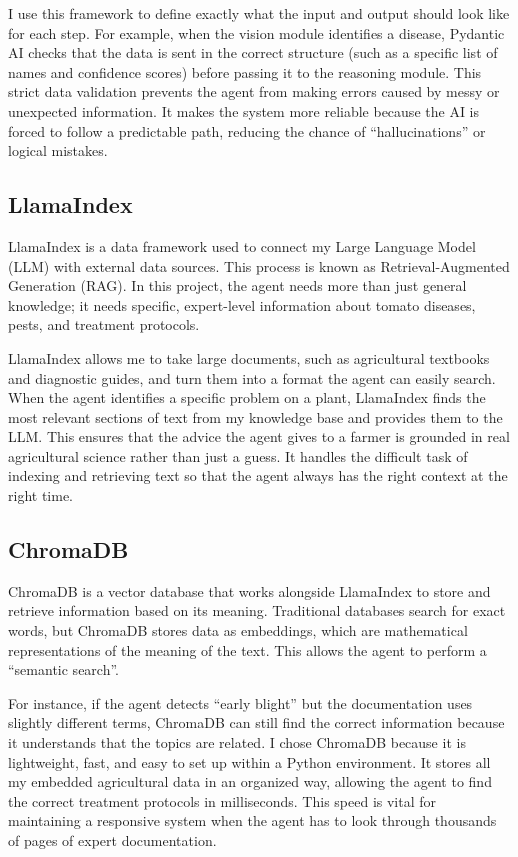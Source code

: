 I use this framework to define exactly what the input and output should look like for each step. For example, when the vision module identifies a disease, Pydantic AI checks that the data is sent in the correct structure (such as a specific list of names and confidence scores) before passing it to the reasoning module. This strict data validation prevents the agent from making errors caused by messy or unexpected information. It makes the system more reliable because the AI is forced to follow a predictable path, reducing the chance of ``hallucinations'' or logical mistakes.

\subsection{LlamaIndex}
LlamaIndex is a data framework used to connect my Large Language Model (LLM) with external data sources. This process is known as Retrieval-Augmented Generation (RAG). In this project, the agent needs more than just general knowledge; it needs specific, expert-level information about tomato diseases, pests, and treatment protocols.

LlamaIndex allows me to take large documents, such as agricultural textbooks and diagnostic guides, and turn them into a format the agent can easily search. When the agent identifies a specific problem on a plant, LlamaIndex finds the most relevant sections of text from my knowledge base and provides them to the LLM. This ensures that the advice the agent gives to a farmer is grounded in real agricultural science rather than just a guess. It handles the difficult task of indexing and retrieving text so that the agent always has the right context at the right time.

\subsection{ChromaDB}
ChromaDB is a vector database that works alongside LlamaIndex to store and retrieve information based on its meaning. Traditional databases search for exact words, but ChromaDB stores data as embeddings, which are mathematical representations of the meaning of the text. This allows the agent to perform a ``semantic search''.

For instance, if the agent detects ``early blight'' but the documentation uses slightly different terms, ChromaDB can still find the correct information because it understands that the topics are related. I chose ChromaDB because it is lightweight, fast, and easy to set up within a Python environment. It stores all my embedded agricultural data in an organized way, allowing the agent to find the correct treatment protocols in milliseconds. This speed is vital for maintaining a responsive system when the agent has to look through thousands of pages of expert documentation.

